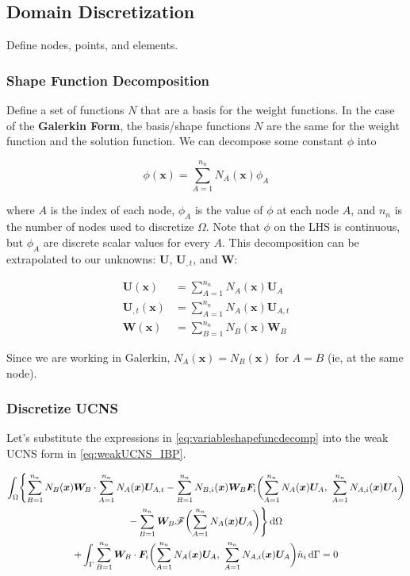 \documentclass[11pt, letterpaper, twoside]{article}
\renewcommand{\vec}[1]{\bm{#1}}
\newcommand{\U}{\vec{U}}
\newcommand{\F}{\vec{F}}
\newcommand{\W}{\vec{W}}
\newcommand{\x}{\vec{x}}
\newcommand{\NAx}{N_A(\x)}
\newcommand{\NBx}{N_B(\x)}
\newcommand{\NAix}{N_{A,i}(\x)}
\newcommand{\NBix}{N_{B,i}(\x)}
\newcommand{\sumA}[1]{\sum_{A=1}^{#1}}
\newcommand{\sumB}[1]{\sum_{B=1}^{#1}}
\newcommand{\src}{\vec{\mathscr{F}}}
\begin{document}
    \subsection{Domain Discretization}
        Define nodes, points, and elements. 

        \subsubsection{Shape Function Decomposition}
        Define a set of functions \(N\) that are a basis for the weight functions. In the case of the \textbf{Galerkin Form}, the basis/shape functions \(N\) are the same for the weight function and the solution function. We can decompose some constant \(\phi\) into

        \begin{equation}
            \phi(\x) = \sum_{A=1}^{n_n} N_A(\x) \phi_A
        \end{equation}

        where \(A\) is the index of each node, \(\phi_A\) is the value of \(\phi\) at each node \(A\), and \(n_n\) is the number of nodes used to discretize \(\Omega\). Note that \(\phi\) on the LHS is continuous, but \(\phi_A\) are discrete scalar values for every \(A\). This decomposition can be extrapolated to our unknowns: \(\U\), \(\U_{,t}\), and \(\W\):

        \begin{subequations}
            \label{eq:variableshapefuncdecomp}
           \begin{align}
                \U(\x) &= \sum_{A=1}^{n_n} N_A(\x) \U_A \\
                \U_{,t}(\x) &= \sum_{A=1}^{n_n} N_A(\x) \U_{A,t} \\
                \W(\x) &= \sum_{B=1}^{n_n} N_B(\x) \W_B 
           \end{align} 
        \end{subequations}

        Since we are working in Galerkin, \(N_A(\x) = N_B(\x) \) for \(A=B\) (ie, at the same node). 

        \subsubsection{Discretize UCNS}
            Let's substitute the expressions in \cref{eq:variableshapefuncdecomp} into the weak UCNS form in \cref{eq:weakUCNS_IBP}.

            \begin{multline}
                \int_\Omega \Biggl\{ \sumB{n_n} \NBx \W_B \cdot \sumA{n_n} \NAx \U_{A,t} 
                - \sumB{n_n} \NBix \W_B \F_i \biggl(\sumA{n_n} \NAx \U_A,\ \sumA{n_n} \NAix \U_A\biggr) \\
                - \sumB{n_n} \W_B \src\biggl(\sumA{n_n} \NAx \U_A \biggr) \Biggr\} \dif \Omega \\
                + \int_\Gamma \sumB{n_n} \W_B \cdot \F_i\biggl(\sumA{n_n} \NAx \U_A,\ \sumA{n_n} \NAix \U_A\biggr) \hat n_i \dif \Gamma = 0
            \end{multline}
\end{document}
